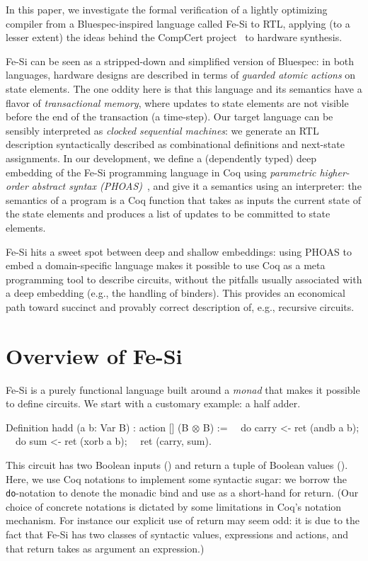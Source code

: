 \documentclass{llncs}
\newcommand{\project}{Fe-Si}
\begin{document}
\medskip In this paper, we investigate the formal verification of a
lightly optimizing compiler from a Bluespec-inspired language called
\project{} to RTL, applying (to a lesser extent) the ideas behind the
CompCert project~\cite{Leroy-backend} to hardware synthesis.

\medskip

\project{} can be seen as a stripped-down and simplified version
of Bluespec: in both languages, hardware designs are described in
terms of \emph{guarded atomic actions} on state elements. 
%
The one oddity here is that this language and its semantics have a
flavor of \emph{transactional memory}, where updates to state
elements are not visible before the end of the transaction (a
time-step).
%
Our target language can be sensibly interpreted as \emph{clocked
  sequential machines}: we generate an RTL description syntactically
described as combinational definitions and next-state assignments.
%
In our development, we define a (dependently typed) deep embedding of
the \project{} programming language in Coq using \emph{parametric
  higher-order abstract syntax (PHOAS)}~\cite{phoas-chlipala}, and
give it a semantics using an interpreter: the semantics of a program
is a Coq function that takes as inputs the current state of the
state elements and produces a list of updates to be committed to
state elements.

\project{} hits a sweet spot between deep and shallow embeddings: using
PHOAS to embed a domain-specific language makes it possible to use Coq
as a meta programming tool to describe circuits, without the pitfalls
usually associated with a deep embedding (e.g., the handling of
binders).
%
This provides an economical path toward succinct and provably correct
description of, e.g., recursive circuits.

\section{Overview of Fe-Si}
Fe-Si is a purely functional language built around a \emph{monad} that
makes it possible to define circuits. We start with a customary
example: a half adder.
\begin{mcoq}
Definition hadd (a b: Var B) : action [] (B $\otimes$ B) :=
$\quad$do carry <- ret (andb a b); 
$\quad$do sum    <- ret (xorb a b);
$\quad$ret (carry, sum).  
\end{mcoq}
This circuit has two Boolean inputs () and return a tuple
of Boolean values ().
%
Here, we use Coq notations to implement some syntactic sugar: we
borrow the \texttt{do}-notation to denote the monadic bind and use
 as a short-hand for return. 
% 
(Our choice of concrete notations is dictated by some limitations in
Coq's notation mechanism. For instance our explicit use of return may
seem odd: it is due to the fact that Fe-Si has two classes of
syntactic values, expressions and actions, and that return takes as
argument an expression.)
\end{document}
